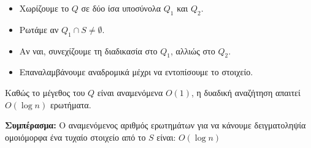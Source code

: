 \documentclass[12pt]{article}
\begin{document}
\vspace{0.3em}
\begin{itemize}
  \item Χωρίζουμε το $Q$ σε δύο ίσα υποσύνολα $Q_1$ και $Q_2$.
  \item Ρωτάμε αν $Q_1 \cap S \neq \emptyset$.
  \item Αν ναι, συνεχίζουμε τη διαδικασία στο $Q_1$, αλλιώς στο $Q_2$.
  \item Επαναλαμβάνουμε αναδρομικά μέχρι να εντοπίσουμε το στοιχείο.
\end{itemize}

\vspace{0.5em}
Καθώς το μέγεθος του $Q$ είναι αναμενόμενα $O(1)$, η δυαδική αναζήτηση απαιτεί $O(\log n)$ ερωτήματα.

\vspace{0.5em}
\noindent
\textbf{Συμπέρασμα:} Ο αναμενόμενος αριθμός ερωτημάτων για να κάνουμε δειγματοληψία ομοιόμορφα ένα τυχαίο στοιχείο από το $S$ είναι: $O(\log n)$
\end{document}
